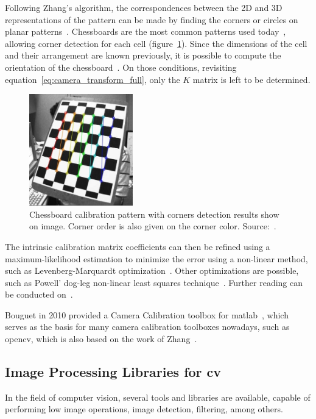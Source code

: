 Following Zhang's algorithm, the correspondences between the 2D and 3D representations of the pattern can be made by finding the corners or circles on planar patterns~\cite{opencv, mvg_book}. Chessboards are the most common patterns used today~\cite{opencv}, allowing corner detection for each cell (figure~\ref{fig:opencv_calib_pattern}). Since the dimensions of the cell and their arrangement are known previously, it is possible to compute the orientation of the chessboard~\cite{Zhang2000, opencv_doc, mvg_book}. On those conditions, revisiting equation~\eqref{eq:camera_transform_full}, only the $K$ matrix is left to be determined. 

\begin{figure}[t]
	\centering
	\includegraphics[width=0.4\textwidth, keepaspectratio]{img/camera/calib_pattern.jpg}
	\caption{Chessboard calibration pattern with corners detection results show on image. Corner order is also given on the corner color. Source:~\cite{OpenCV_camera_calib}.}
	\label{fig:opencv_calib_pattern}
\end{figure}

The intrinsic calibration matrix coefficients can then be refined using a maximum-likelihood estimation to minimize the error using a non-linear method, such as Levenberg-Marquardt optimization~\cite{Levenberg1943}. Other optimizations are possible, such as Powell’ dog-leg non-linear least squares technique~\cite{Lourakis2005}. Further reading can be conducted on~\cite{mvg_book, Sturm2010, camera_models, Hata, Xu1996a}.

Bouguet in 2010 provided a Camera Calibration toolbox for \ac{matlab}~\cite{Bouguet2010}, which serves as the basis for many camera calibration toolboxes nowadays, such as \ac{opencv}, which is also based on the work of Zhang~\cite{opencv}.

\subsection{Image Processing Libraries for \acl{cv}}
In the field of computer vision, several tools and libraries are available, capable of performing low image operations, image detection, filtering, among others. 

